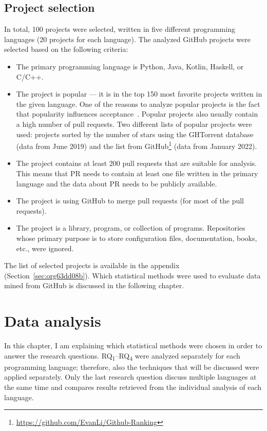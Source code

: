 \documentclass[digital,oneside,oldtable,nolof,nolot,nocover]{fithesis4}
\begin{document}
\section{Project selection}
\label{sec:org695a3a1}
In total, 100 projects were selected, written in five different
programming languages (20 projects for each language). The analyzed GitHub
projects were selected based on the following criteria:
\begin{itemize}
\item The primary programming language is Python, Java, Kotlin, Haskell, or C/C++.
\item The project is popular --- it is in the top 150 most favorite projects written in the given language.
One of the reasons to analyze popular projects is the fact that popularity influences acceptance~\cite{social}.
Popular projects also usually contain a high number of pull requests.
Two different lists of popular projects were used: projects sorted by the
number of stars using the GHTorrent database (data from  June 2019) and the list from
GitHub\footnote{\url{https://github.com/EvanLi/Github-Ranking}} (data from  January 2022).
\item The project contains at least 200 pull requests that are suitable for analysis.
This means that PR needs to contain at least one file written in the
primary language and the data about PR needs to be publicly available.
\item The project is using GitHub to merge pull requests (for most of the pull requests).
\item The project is a library, program, or collection of programs. Repositories whose primary purpose is
to store configuration files, documentation, books, etc., were ignored.
\end{itemize}
The list of selected projects is available in the appendix (Section~\ref{sec:org63dd08b}). Which statistical
methods were used to evaluate data mined from GitHub is discussed in the following chapter.
\chapter{Data analysis}
\label{sec:org93daf44}
In this chapter, I am explaining which statistical methods were chosen in
order to answer the research questions. RQ\textsubscript{1}--RQ\textsubscript{4} were
analyzed separately for each programming language; therefore, also the
techniques that will be discussed were applied separately.  Only the last
research question discuss multiple languages at the same time and compares
results retrieved from the individual analysis of each language.
\end{document}
